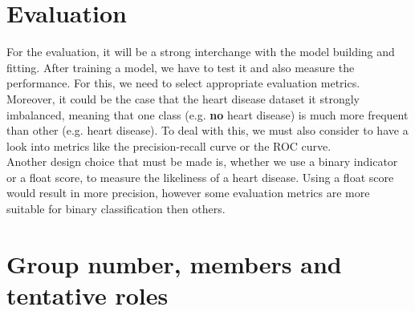 \documentclass{article}
\begin{document}
\newpage


\section{Evaluation}

For the evaluation, it will be a strong interchange with the model building and fitting. After training a model, we have to test it and also measure the performance. For this, we need to select appropriate evaluation metrics. Moreover, it could be the case that the heart disease dataset it strongly imbalanced, meaning that one class (e.g. \textbf{no} heart disease) is much more frequent than other (e.g. heart disease). To deal with this, we must also consider to have a look into metrics like the precision-recall curve or the ROC curve.\\
Another design choice that must be made is, whether we use a binary indicator or a float score, to measure the likeliness of a heart disease. Using a float score would result in more precision, however some evaluation metrics are more suitable for binary classification then others.

\section{Group number, members and tentative roles}
\end{document}
